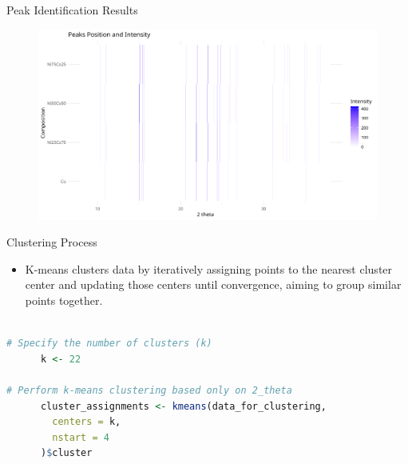 \documentclass[aspectratio=169]{beamer}
\begin{document}
\begin{frame}{Peak Identification Results}
    \begin{figure}
        \includegraphics[width=1\textwidth]{../plot/peaks.png}
    \end{figure}
\end{frame}




\begin{frame}[fragile]{Clustering Process}
    \begin{itemize}
        \item K-means clusters data by iteratively assigning points to the nearest cluster center and updating those centers until convergence, aiming to group similar points together.
    \end{itemize}

    \begin{lstlisting}[language=R, basicstyle=\small\ttfamily]
    
# Specify the number of clusters (k)
      k <- 22

# Perform k-means clustering based only on 2_theta
      cluster_assignments <- kmeans(data_for_clustering,
        centers = k,
        nstart = 4
      )$cluster

    \end{lstlisting}
\end{frame}
\end{document}
